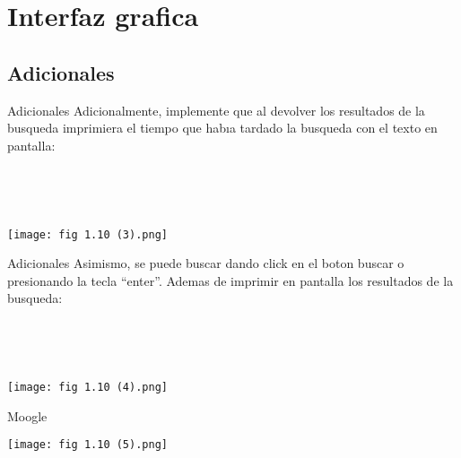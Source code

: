 \section{Interfaz grafica}

\subsection{Adicionales}
\begin{frame}{Adicionales}
    Adicionalmente, implemente que al devolver los resultados de la busqueda imprimiera el tiempo que habıa
tardado la busqueda con el texto en pantalla:

\pause

\

\

\begin{center}
    \texttt{[image: fig 1.10 (3).png]}
\end{center}
\end{frame}

\begin{frame}{Adicionales}
    Asimismo, se puede buscar dando click en el boton buscar o presionando la tecla “enter”.
    Ademas de imprimir en pantalla los resultados de la busqueda:

\pause

\

\

\begin{center}
    \texttt{[image: fig 1.10 (4).png]}
\end{center}
\end{frame}

\begin{frame}{Moogle}
    \begin{center}
        \texttt{[image: fig 1.10 (5).png]}
    \end{center}
\end{frame}